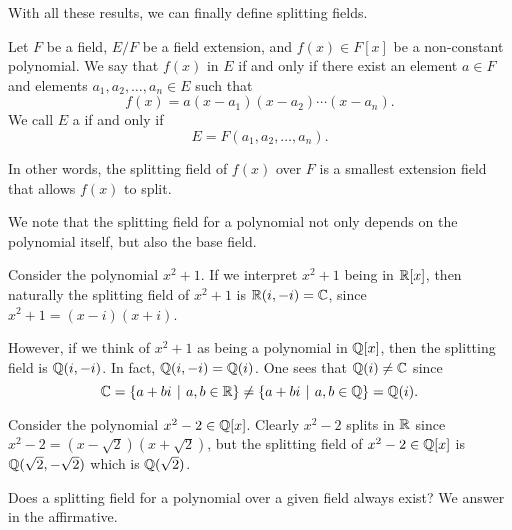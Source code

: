 With all these results, we can finally define splitting fields.

\begin{definition}
    Let $F$ be a field, $E/F$ be a field extension, and $f(x) \in F[x]$ be a non-constant polynomial. We say that $f(x)$  in $E$ if and only if there exist an element $a \in F$ and elements $a_1, a_2, \dots, a_n \in E$ such that
    \[
        f(x) = a(x-a_1)(x-a_2)\cdots(x-a_n).
    \]
    We call $E$ a  if and only if
    \[
        E = F(a_1, a_2, \dots, a_n).
    \]
\end{definition}
\begin{remark}
    In other words, the splitting field of $f(x)$ over $F$ is a smallest extension field that allows $f(x)$ to split.
\end{remark}

We note that the splitting field for a polynomial not only depends on the polynomial itself, but also the base field.

\begin{example}
    Consider the polynomial $x^2 + 1$. If we interpret $x^2 + 1$ being in $\mathbb{R}[x]$, then naturally the splitting field of $x^2 + 1$ is $\mathbb{R}(i, -i) = \mathbb{C}$, since $x^2 + 1 = (x-i)(x+i)$.

    However, if we think of $x^2+1$ as being a polynomial in $\mathbb{Q}[x]$, then the splitting field is $\mathbb{Q}(i, -i)$. In fact, $\mathbb{Q}(i, -i) = \mathbb{Q}(i)$. One sees that $\mathbb{Q}(i) \neq \mathbb{C}$ since
    \[
        \C = \{a + bi \vert a,b \in \R\} \neq \{a + bi \vert a,b \in \Q\} = \Q(i).
    \]
\end{example}

\begin{example}
    Consider the polynomial $x^2 - 2 \in \mathbb{Q}[x]$. Clearly $x^2 - 2$ splits in $\mathbb{R}$ since $x^2 - 2 = (x - \sqrt2)(x + \sqrt2)$, but the splitting field of $x^2 - 2 \in \mathbb{Q}[x]$ is $\mathbb{Q}(\sqrt2, -\sqrt2)$ which is $\mathbb{Q}(\sqrt 2)$.
\end{example}

Does a splitting field for a polynomial over a given field always exist? We answer in the affirmative.

